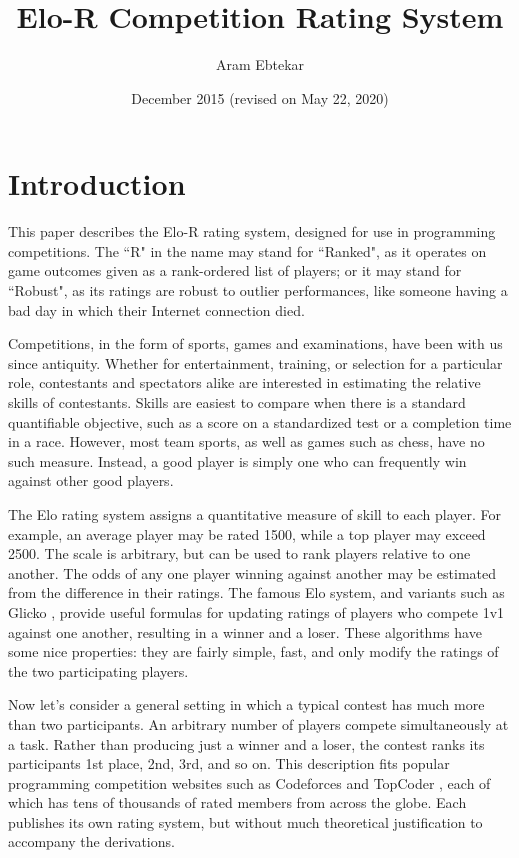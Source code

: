 \documentclass{article}
\title{Elo-R Competition Rating System}
\author{Aram Ebtekar}
\date{December 2015 (revised on May 22, 2020)}
\begin{document}
\maketitle

\section{Introduction}

This paper describes the Elo-R rating system, designed for use in programming competitions. The ``R" in the name may stand for ``Ranked", as it operates on game outcomes given as a rank-ordered list of players; or it may stand for ``Robust", as its ratings are robust to outlier performances, like someone having a bad day in which their Internet connection died.

Competitions, in the form of sports, games and examinations, have been with us since antiquity. Whether for entertainment, training, or selection for a particular role, contestants and spectators alike are interested in estimating the relative skills of contestants. Skills are easiest to compare when there is a standard quantifiable objective, such as a score on a standardized test or a completion time in a race.  However, most team sports, as well as games such as chess, have no such measure. Instead, a good player is simply one who can frequently win against other good players.

The Elo rating system assigns a quantitative measure of skill to each player. For example, an average player may be rated 1500, while a top player may exceed 2500. The scale is arbitrary, but can be used to rank players relative to one another. The odds of any one player winning against another may be estimated from the difference in their ratings. The famous Elo system, and variants such as Glicko \cite{glicko}, provide useful formulas for updating ratings of players who compete 1v1 against one another, resulting in a winner and a loser. These algorithms have some nice properties: they are fairly simple, fast, and only modify the ratings of the two participating players.

Now let's consider a general setting in which a typical contest has much more than two participants. An arbitrary number of players compete simultaneously at a task. Rather than producing just a winner and a loser, the contest ranks its participants 1st place, 2nd, 3rd, and so on. This description fits popular programming competition websites such as Codeforces \cite{Codeforces} and TopCoder \cite{TopCoder}, each of which has tens of thousands of rated members from across the globe. Each publishes its own rating system, but without much theoretical justification to accompany the derivations.
\end{document}
